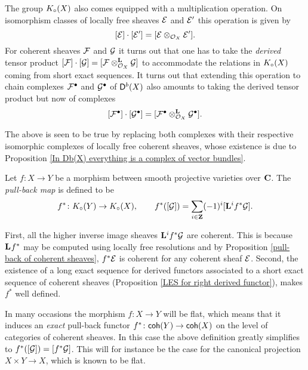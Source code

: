 The group $K_{\circ}(X)$ also comes equipped with a multiplication operation. On isomorphism classes of locally free sheaves $\mathcal E$ and $\mathcal E'$ this operation is given by
\[
    [\mathcal E]\cdot[\mathcal E'] = [\mathcal E \otimes_{{\mathcal{O}_{X}}} \mathcal E'].
\]
For coherent sheaves $\mathcal F$ and $\mathcal G$ it turns out that one has to take the \emph{derived} tensor product $[\mathcal F]\cdot[\mathcal G] = [\mathcal F \otimes_{{\mathcal{O}_{X}}}^{\mathbf{L}} \mathcal G]$ to accommodate the relations in $K_{\circ}(X)$ coming from short exact sequences. It turns out that extending this operation to chain complexes $\mathcal F^\bullet$ and $\mathcal G^\bullet$ of $\mathsf{D}^b(X)$ also amounts to taking the derived tensor product but now of complexes
\begin{equation}
    \label{eq: K-theory product compatibility}
    [\F^\bullet]\cdot [\G^\bullet] = [\derivedtensor{\F^\bullet}{\G^\bullet}{\struct{X}}].
\end{equation}

\begin{remark}
    The above is seen to be true by replacing both complexes with their respective isomorphic complexes of locally free coherent sheaves, whose existence is due to Proposition \ref{In Db(X) everything is a complex of vector bundles}.
\end{remark}

\begin{definition}
    Let $f \colon X \to Y$ be a morphism between smooth projective varieties over $\mathbf C$. The \emph{pull-back map} is defined to be
    \[
        f^* \colon K_{\circ}(Y) \to K_{\circ}(X), \qquad f^*([\mathcal G]) = \sum_{i \in \mathbf Z}(-1)^i[\mathbf{L}^{i}f^*\mathcal G].
    \]
\end{definition}

\begin{remark}
    First, all the higher inverse image sheaves $\mathbf{L}^{i}f^*\mathcal G$ are coherent. This is because $\mathbf{L}^{}f^*$ may be computed using locally free resolutions and by Proposition \ref{pull-back of coherent sheaves}, $f^*\mathcal E$ is coherent for any coherent sheaf $\mathcal E$. Second, the existence of a long exact sequence for derived functors associated to a short exact sequence of coherent sheaves (Proposition \ref{LES for right derived functor}), makes $f^*$ well defined.    
    
    In many occasions the morphism $f \colon X \to Y$ will be flat, which means that it induces an \emph{exact} pull-back functor $f^* \colon \mathsf{coh}(Y) \to \mathsf{coh}(X)$ on the level of categories of coherent sheaves. In this case the above definition greatly simplifies to $f^*([\mathcal G]) = [f^*\mathcal G]$. This will for instance be the case for the canonical projection $X \times Y \to X$, which is known to be flat.  
\end{remark}

